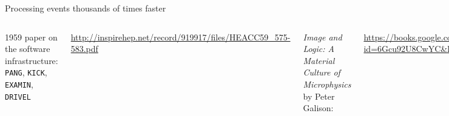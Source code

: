 \documentclass[aspectratio=169]{beamer}
\begin{document}
\begin{frame}{Processing events thousands of times faster}
\vspace{0.35 cm}
\begin{columns}
1959 paper on the software infrastructure: {\tt PANG}, {\tt KICK}, {\tt EXAMIN}, {\tt DRIVEL}

\small
\vspace{0.2 cm}
\textcolor{blue}{\url{http://inspirehep.net/record/919917/files/HEACC59_575-583.pdf}}

\normalsize
\vspace{0.4 cm}
{\it Image and Logic: A Material Culture of Microphysics} by Peter Galison:

\small
\vspace{0.2 cm}
\textcolor{blue}{\url{https://books.google.com/books?id=6Gcu92U8CwYC\&lpg=PA373\&ots=8YV5cPePE6\&dq=Franckenstein\%20bubble\&pg=PA373\#v=onepage\&q=Franckenstein\&f=false}}

\normalsize
\vspace{0.4 cm}
{\it Discovering Alvarez: Selected Works of Luis W. Alvarez}: that plot $\longrightarrow$

\includegraphics[width=\linewidth]{scaleup.png}
\end{columns}
\end{frame}
\end{document}
